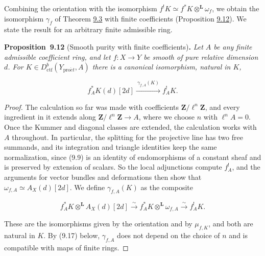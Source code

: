 \documentclass[11pt]{article}
\newenvironment{bpstatement}[2]{\par\addvspace{0.6\baselineskip}\noindent\textbf{#1}#2\textbf{.}\enspace\ignorespaces}
  {\par\addvspace{0.4\baselineskip}}
\newenvironment{bpstatementit}[2]{\begin{bpstatement}{#1}{#2}\itshape\ignorespaces}{\end{bpstatement}}
\begin{document}
Combining the orientation with the isomorphism \(f^!K\simeq f^*K\otimes^{\mathbf L}\omega_f\), we obtain the isomorphism \(\gamma_f\) of Theorem \hyperref[bp9]{9.3} with finite coefficients (Proposition \hyperref[bp37]{9.12}). We state the result for an arbitrary finite admissible ring.

\label{bp37}%
\begin{bpstatementit}{Proposition~9.12}{ (Smooth purity with finite coefficients)}
Let \(A\) be any finite admissible coefficient ring, and let \(f:X\to Y\) be smooth of pure relative dimension \(d\). For \(K\in D^b_{\mathrm{ctf}}(Y_{\mathrm{pro}\acute{e}t},A)\) there is a canonical isomorphism, natural in \(K\),

\[
f_A^{*}K(d)[2d]
\xrightarrow{\ \gamma_{f,A}(K)\ }f_A^{!}K.
\tag{9.15}
\]
\end{bpstatementit}

\begin{proof}[{Proof}]\label{bp38}%
The calculation so far was made with coefficients \(\mathbf Z/\ell^n\mathbf Z\), and every ingredient in it extends along \(\mathbf Z/\ell^n\mathbf Z\to A\), where we choose \(n\) with \(\ell^nA=0\). Once the Kummer and diagonal classes are extended, the calculation works with \(A\) throughout. In particular, the splitting for the projective line has two free summands, and its integration and triangle identities keep the same normalization, since (9.9) is an identity of endomorphisms of a constant sheaf and is preserved by extension of scalars. So the local adjunctions compute \(f_A^!\), and the arguments for vector bundles and deformations then show that \(\omega_{f,A}\simeq A_X(d)[2d]\). We define \(\gamma_{f,A}(K)\) as the composite

\[
f_A^{*}K\otimes^{\mathbf L}A_X(d)[2d]
\xrightarrow{\sim}f_A^{*}K\otimes^{\mathbf L}\omega_{f,A}
\xrightarrow{\sim}f_A^{!}K.
\]

These are the isomorphisms given by the orientation and by \(\mu_{f,K}\), and both are natural in \(K\). By (9.17) below, \(\gamma_{f,A}\) does not depend on the choice of \(n\) and is compatible with maps of finite rings.
\end{proof}


\end{document}
